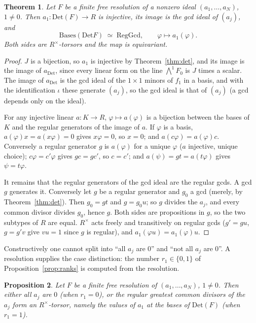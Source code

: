 \documentclass[11pt]{amsart}
\newtheorem{theorem}{Theorem}
\newtheorem{proposition}[theorem]{Proposition}
\theoremstyle{definition}
\theoremstyle{remark}
\newcommand{\Det}{\mathrm{Det}}
\newcommand{\Bases}{\mathrm{Bases}}
\newcommand{\RegGcd}{\mathrm{RegGcd}}
\newcommand{\Ex}{{\textstyle\bigwedge}}
\begin{document}
\begin{theorem}\label{thm:gcd}
Let $F$ be a finite free resolution of a nonzero ideal $(a_1,\dots,a_N)$,
$1\neq0$.  Then $a_1:\Det(F)\to R$ is injective, its image is the gcd
ideal of $(a_j)$, and
\[\Bases(\Det F)\;\simeq\;\RegGcd,\qquad\varphi\mapsto a_1(\varphi).\]
Both sides are $R^\times$-torsors and the map is equivariant.
\end{theorem}

\begin{proof}
$J$ is a bijection, so $a_1$ is injective by Theorem~\ref{thm:det}, and
its image is the image of $a_{\Det}$, since every linear form on the line
$\Ex^1F_0$ is $J$ times a scalar.  The image of $a_{\Det}$ is the gcd
ideal of the $1\times1$ minors of $f_1$ in a basis, and with the
identification $\iota$ these generate $(a_j)$, so the gcd ideal is that of
$(a_j)$ (a gcd depends only on the ideal).

For any injective linear $a:K\to R$, $\varphi\mapsto a(\varphi)$ is a
bijection between the bases of $K$ and the regular generators of the
image of $a$.  If $\varphi$ is a basis, $a(\varphi)x=a(x\varphi)=0$ gives
$x\varphi=0$, so $x=0$; and $a(c\varphi)=a(\varphi)c$.  Conversely a
regular generator $g$ is $a(\varphi)$ for a unique $\varphi$ ($a$
injective, unique choice); $c\varphi=c'\varphi$ gives $gc=gc'$, so $c=c'$;
and $a(\psi)=gt=a(t\varphi)$ gives $\psi=t\varphi$.

It remains that the regular generators of the gcd ideal are the regular
gcds.  A gcd $g$ generates it.  Conversely let $g$ be a regular generator
and $g_0$ a gcd (merely, by Theorem~\ref{thm:det}).  Then $g_0=gt$ and
$g=g_0u$; so $g$ divides the $a_j$, and every common divisor divides
$g_0$, hence $g$.  Both sides are propositions in $g$, so the two
subtypes of $R$ are equal.  $R^\times$ acts freely and transitively on
regular gcds ($g'=gu$, $g=g'v$ give $vu=1$ since $g$ is regular), and
$a_1(\varphi u)=a_1(\varphi)u$.
\end{proof}

Constructively one cannot split into ``all $a_j$ are $0$'' and ``not all
$a_j$ are $0$''.  A resolution supplies the case distinction: the number
$r_1\in\{0,1\}$ of Proposition~\ref{prop:ranks} is computed from the
resolution.

\begin{proposition}\label{prop:decide}
Let $F$ be a finite free resolution of $(a_1,\dots,a_N)$, $1\neq0$.
Then either all $a_j$ are $0$ (when $r_1=0$), or the regular greatest
common divisors of the $a_j$ form an $R^\times$-torsor, namely the values
of $a_1$ at the bases of $\Det(F)$ (when $r_1=1$).
\end{proposition}
\end{document}
